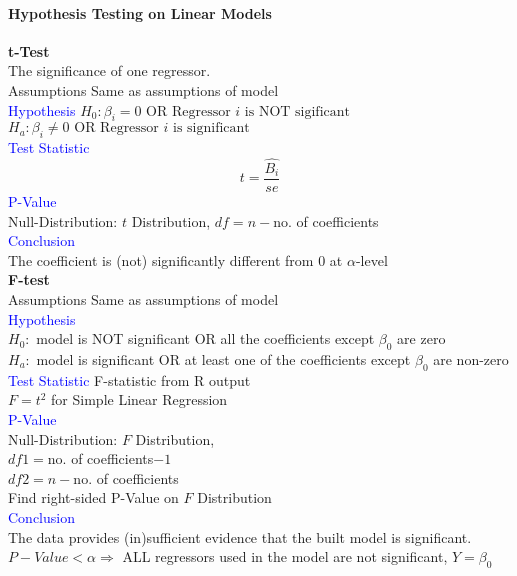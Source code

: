 \paragraph{Hypothesis Testing on Linear Models}
\textbf{t-Test}\\
The significance of one regressor.\\
\textcolor{Bittersweet}{Assumptions} Same as assumptions of model\\
\textcolor{Blue}{Hypothesis}
$H_0\colon\beta_i=0\text{ OR Regressor }i\text{ is NOT sigificant}$\\
$H_a\colon\beta_i\neq0\text{ OR Regressor }i\text{ is significant}$\\
\textcolor{Blue}{Test Statistic}
\[t=\frac{\hat{B_i}}{se}\]
\textcolor{Blue}{P-Value}\\
Null-Distribution: $t$ Distribution, $df=n-$no. of coefficients\\
\textcolor{Blue}{Conclusion}\\
The coefficient is (not) significantly different from 0 at $\alpha$-level\\
\textbf{F-test}\\
\textcolor{Bittersweet}{Assumptions} Same as assumptions of model\\
\textcolor{Blue}{Hypothesis}\\
$H_0\colon$ model is NOT significant OR all the coefficients except $\beta_0$ are zero\\
$H_a\colon$ model is significant OR at least one of the coefficients except $\beta_0$ are non-zero\\
\textcolor{Blue}{Test Statistic} F-statistic from R output\\
$F=t^2$ for Simple Linear Regression\\
\textcolor{Blue}{P-Value}\\
Null-Distribution: $F$ Distribution,\\
$df1=$no. of coefficients$-1$\\
$df2=n-$no. of coefficients\\
Find right-sided P-Value on $F$ Distribution\\
\textcolor{Blue}{Conclusion}\\
The data provides (in)sufficient evidence that the built model is significant.\\
$P-Value<\alpha\Rightarrow$ ALL regressors used in the model are not significant, $Y=\beta_0$
